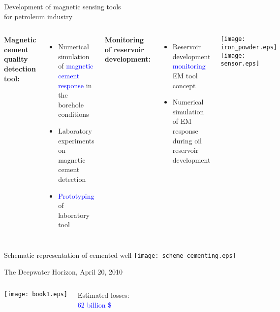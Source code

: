\documentclass[aspectratio=169]{beamer}
\begin{document}
\begin{frame}{Development of magnetic sensing tools \\ for petroleum industry}

\begin{columns}[c] 


\textbf{Magnetic cement quality detection tool:}
\begin{itemize}

\item Numerical simulation of \textcolor{blue} {magnetic cement response} in the borehole conditions
\item Laboratory experiments on magnetic cement detection
\item \textcolor{blue} {Prototyping} of laboratory tool

\end{itemize}


\textbf{Monitoring of reservoir development:}
\begin{itemize}

\item Reservoir development \textcolor{blue} {monitoring} EM tool concept
\item Numerical simulation of EM response during oil reservoir development

\end{itemize}


\texttt{[image: iron\_powder.eps]}
\texttt{[image: sensor.eps]}
\centering

\end{columns}
 
\end{frame}


\begin{frame}{Schematic representation of cemented well}
\centering
\texttt{[image: scheme\_cementing.eps]}

\end{frame}

%

\begin{frame}{The Deepwater Horizon, April 20, 2010}
\begin{columns}[c] 



\centering
\texttt{[image: book1.eps]}

\centering
\begin{Large}
Estimated losses: \\ \textcolor{blue} {62 billion \$}
\end{Large}

\end{columns} 

\end{frame}
\end{document}
